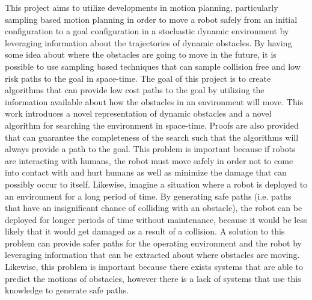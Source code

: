 This project aims to utilize developments in motion planning, particularly
sampling based motion planning in order to move a robot safely from an initial
configuration to a goal configuration in a stochastic dynamic environment by
leveraging information about the trajectories of dynamic obstacles. By having
some idea about where the obstacles are going to move in the future, it is
possible to use sampling based techniques that can sample collision free and
low risk paths to the goal in space-time. The goal of this project is to create
algorithms that can provide low cost paths to the goal by utilizing the
information available about how the obstacles in an environment will move. This
work introduces a novel representation of dynamic obstacles and a novel
algorithm for searching the environment in space-time.  Proofs are also
provided that can guarantee the completeness of the search such that the
algorithms will always provide a path to the goal. This problem is important
because if robots are interacting with humans, the robot must move safely in
order not to come into contact with and hurt humans as well as minimize the
damage that can possibly occur to itself. Likewise, imagine a situation where a
robot is deployed to an environment for a long period of time. By generating
safe paths (i.e. paths that have an insignificant chance of colliding with an
obstacle), the robot can be deployed for longer periods of time without
maintenance, because it would be less likely that it would get damaged as a
result of a collision. A solution to this problem can provide safer paths for
the operating environment and the robot by leveraging information that can be
extracted about where obstacles are moving.  Likewise, this problem is
important because there exists systems that are able to predict the motions of
obstacles, however there is a lack of systems that use this knowledge to
generate safe paths.


